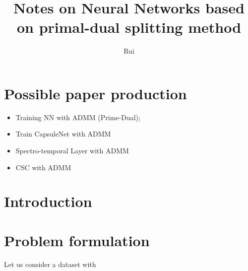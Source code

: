 \documentclass[11pt,a4paper]{article}
\title{Notes on Neural Networks based on primal-dual splitting method }
\author{Rui}
\begin{document}
\maketitle

\tableofcontents
\section{Possible paper production}
\begin{itemize}
	\item Training NN with ADMM (Prime-Dual); 
	\item Train CapsuleNet with ADMM
	\item Spectro-temporal Layer with ADMM
	\item CSC with ADMM
\end{itemize}
\section{Introduction}

\section{Problem formulation}

Let us consider a dataset with 
\end{document}
